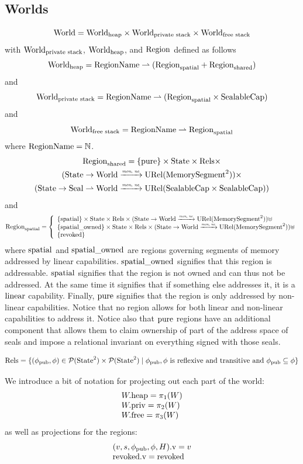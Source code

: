 \documentclass[a4paper]{article}
\begin{document}
\subsection{Worlds}
\[
  \mathrm{World} = \mathrm{World}_\mathrm{heap} \times \mathrm{World}_\text{private stack} \times \mathrm{World}_\text{free stack}
\]
with $\mathrm{World}_\text{private stack}$, $\mathrm{World}_\mathrm{heap}$, and $\mathrm{Region}$ defined as follows
\[
  \mathrm{World}_\mathrm{heap} = \mathrm{RegionName} \rightharpoonup (\mathrm{Region}_\mathrm{spatial} + \mathrm{Region}_\mathrm{shared})
\]
and
\[
  \mathrm{World}_\text{private stack} = \mathrm{RegionName} \rightharpoonup (\mathrm{Region}_\mathrm{spatial} \times \mathrm{SealableCap})
\]
and
\[
  \mathrm{World}_\text{free stack} = \mathrm{RegionName} \rightharpoonup \mathrm{Region}_\mathrm{spatial}
\]
where $\mathrm{RegionName} = \mathbb{N}$.
\begin{multline*}
  \mathrm{Region}_\mathrm{shared} = 
  \{\mathrm{pure} \} \times \mathrm{State} \times \mathrm{Rels} \times\\
  (\mathrm{State} \rightarrow \mathrm{World} \xrightarrow{\textit{\tiny{mon, ne}}} \mathrm{URel}(\mathrm{MemorySegment}^2)) \times \\
  (\mathrm{State} \rightarrow \mathrm{Seal} \rightharpoonup \mathrm{World} \xrightarrow{\textit{\tiny{mon, ne}}} \mathrm{URel}(\mathrm{SealableCap} \times \mathrm{SealableCap}))
\end{multline*}
and
\[
  \mathrm{Region}_\mathrm{spatial} = \left\{
  \begin{array}{l}
    \{\mathrm{spatial} \} \times \mathrm{State} \times \mathrm{Rels} \times (\mathrm{State} \rightarrow \mathrm{World} \xrightarrow{\textit{\tiny{mon, ne}}} \mathrm{URel}(\mathrm{MemorySegment}^2)) \uplus \\
    \{\mathrm{spatial\_owned} \} \times \mathrm{State} \times \mathrm{Rels} \times (\mathrm{State} \rightarrow \mathrm{World} \xrightarrow{\textit{\tiny{mon, ne}}} \mathrm{URel}(\mathrm{MemorySegment}^2))\uplus \\ 
    \{\mathrm{revoked}\}
  \end{array} \right.
\]
where $\mathrm{spatial}$ and $\mathrm{spatial\_owned}$ are regions governing segments of memory addressed by linear capabilities.
$\mathrm{spatial\_owned}$ signifies that this region is addressable.
$\mathrm{spatial}$ signifies that the region is not owned and can thus not be addressed.
At the same time it signifies that if something else addresses it, it is a $\mathrm{linear}$ capability.
Finally, $\mathrm{pure}$ signifies that the region is only addressed by non-linear capabilities.
Notice that no region allows for both linear and non-linear capabilities to address it.
Notice also that $\mathrm{pure}$ regions have an additional component that allows them to claim ownership of part of the address space of seals and impose a relational invariant on everything signed with those seals.

\[
  \mathrm{Rels} = \{(\phi_{\mathrm{pub}}, \phi) \in \mathcal{P}(\mathrm{State}^2)\times \mathcal{P}(\mathrm{State}^2) \mid \phi_{\mathrm{pub}}, \phi \text{ is reflexive and transitive and } \phi_{\mathrm{pub}} \subseteq \phi \}
\]

We introduce a bit of notation for projecting out each part of the world:
\[
  \begin{array}{l}
    W.\mathrm{heap} = \pi_1(W)\\
    W.\mathrm{priv} = \pi_2(W)\\
    W.\mathrm{free} = \pi_3(W)
  \end{array}
\]
as well as projections for the regions:
\[
  \begin{array}{l}
  (v,s,\phi_{\mathrm{pub}},\phi,H).\mathrm{v} = v \\
  \mathrm{revoked}.\mathrm{v} = \mathrm{revoked}     
  \end{array}
\]
\end{document}
